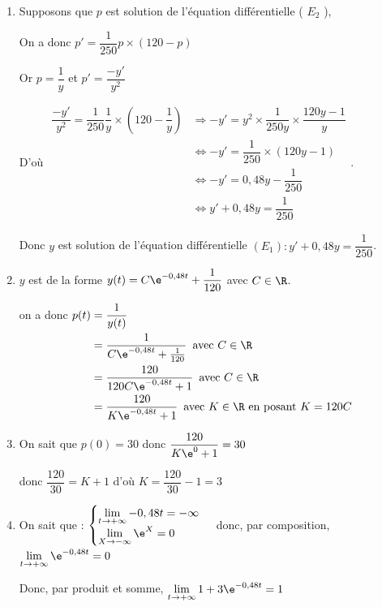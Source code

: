 \begin{enumerate}
\item Supposons que $p$ est solution de l'équation différentielle ( $E_{2}$ ),

On a donc $p'=\dfrac{1}{250} p \times(120-p)$ 

Or $p=\dfrac{1}{y}$ et $p'= \dfrac{-y'}{y^2}$ 

D'où  $\begin{aligned} \dfrac{-y'}{y^2}= \dfrac{1}{250} \dfrac{1}{y} \times\left( 120-\dfrac{1}{y}\right)& \Longrightarrow -y'=y^2 \times  \dfrac{1}{250y }\times \dfrac{120y-1}{y}\\
&\Longleftrightarrow -y' = \dfrac{1}{250} \times (120y-1)\\
&\Longleftrightarrow -y'= 0,48 y -\dfrac{1}{250}\\
&\Longleftrightarrow y'+0,48 y=\dfrac{1}{250}
\end{aligned}$.

Donc $y$ est solution de l'équation différentielle $\left(E_{1}\right): y'+0,48 y=\dfrac{1}{250}$.

\item $y$ est de la forme $y(t)=C \e^{-0,48t} + \dfrac{1}{120}$ avec $C \in \R$.

on a donc $\begin{aligned}[t] p(t)& = \dfrac{1}{y(t)}\\
& = \dfrac{1}{C \e^{-0,48t} + \frac{1}{120}} \, \text{ avec } C \in \R\\
& = \dfrac{120}{120 C \e^{-0,48t} +1 } \, \text{ avec } C \in \R\\
& = \dfrac{120}{K \e^{-0,48t} +1 } \, \text{ avec } K \in \R \text { en posant }  K=120C\\
\end{aligned}$

\item  On sait que  $p(0)=30$ donc $\dfrac{120}{K \e^{0} +1 }=30$ 

donc $\dfrac{120}{30}= K+1$   d'où $K =\dfrac{120}{30}-1=3$

\item On sait que : $\begin{cases}
\lim\limits_{t \to +\infty }-0,48t= -\infty \\
\lim\limits_{X\to -\infty} \e^X = 0
\end{cases}$ donc, par composition, $\lim\limits_{t\to +\infty }\e^{-0,48t}=0$ 

Donc, par produit et somme, $\lim\limits_{t \to +\infty}1+3\e^{-0,48t}=1$ 


\end{enumerate}
